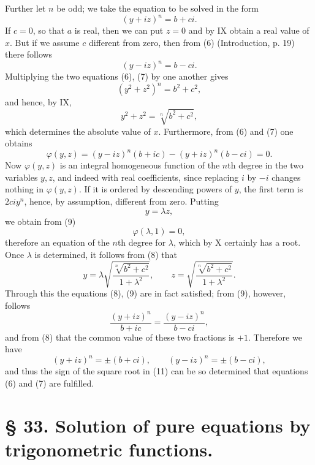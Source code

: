 \documentclass[11pt]{article}
\begin{document}
Further let $n$ be odd; we take the equation to be solved in the form
\begin{equation}
 (y+iz)^n=b+ci.
\tag{6}
\end{equation}
If $c=0$, so that $a$ is real, then we can put $z=0$ and by IX obtain a real value of $x$. But if we assume $c$ different from zero, then from (6) (Introduction, p. 19) there follows
\begin{equation}
 (y-iz)^n=b-ci.
\tag{7}
\end{equation}
Multiplying the two equations (6), (7) by one another gives
\[
 (y^2+z^2)^n=b^2+c^2,
\]
and hence, by IX,
\begin{equation}
 y^2+z^2=\sqrt[n]{b^2+c^2},
\tag{8}
\end{equation}
which determines the absolute value of $x$. Furthermore, from (6) and (7) one obtains
\begin{equation}
 \varphi(y,z)=(y-iz)^n(b+ic)-(y+iz)^n(b-ci)=0.
\tag{9}
\end{equation}
Now $\varphi(y,z)$ is an integral homogeneous function of the $n$th degree in the two variables $y,z$, and indeed with real coefficients, since replacing $i$ by $-i$ changes nothing in $\varphi(y,z)$. If it is ordered by descending powers of $y$, the first term is $2ciy^n$, hence, by assumption, different from zero. Putting
\[
 y=\lambda z,
\]
we obtain from (9)
\begin{equation}
 \varphi(\lambda,1)=0,
\tag{10}
\end{equation}
therefore an equation of the $n$th degree for $\lambda$, which by X certainly has a root. Once $\lambda$ is determined, it follows from (8) that
\begin{equation}
 y=\lambda\sqrt{\frac{\sqrt[n]{b^2+c^2}}{1+\lambda^2}},\qquad
 z=\sqrt{\frac{\sqrt[n]{b^2+c^2}}{1+\lambda^2}}.
\tag{11}
\end{equation}
Through this the equations (8), (9) are in fact satisfied; from (9), however, follows
\[
 \frac{(y+iz)^n}{b+ic}=\frac{(y-iz)^n}{b-ci},
\]
and from (8) that the common value of these two fractions is $+1$. Therefore we have
\[
 (y+iz)^n=\pm(b+ci),\qquad (y-iz)^n=\pm(b-ci),
\]
and thus the sign of the square root in (11) can be so determined that equations (6) and (7) are fulfilled.

\section*{§ 33. Solution of pure equations by trigonometric functions.}
\end{document}
